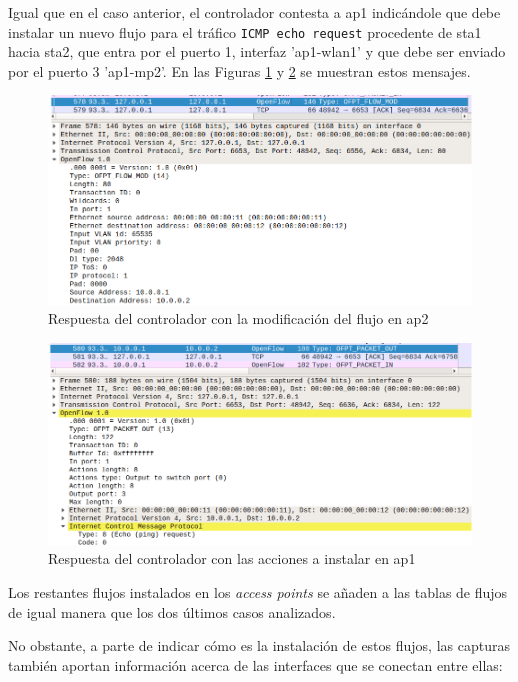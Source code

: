\documentclass[a4paper,12pt,twoside,spanish]{book}
\begin{document}
Igual que en el caso anterior, el controlador contesta a ap1 indicándole que debe instalar un nuevo flujo para el tráfico \texttt{ICMP echo request} procedente de sta1 hacia sta2, que entra por el puerto 1, interfaz 'ap1-wlan1' y que debe ser enviado por el puerto 3 'ap1-mp2'. En las Figuras \ref{fig:capt_7} y \ref{fig:capt_8} se muestran estos mensajes.\par 
	
	\begin{figure}[!h]
		\centering
		\includegraphics[scale=0.4]{Figuras/capt_7.png}
		\caption{Respuesta del controlador con la modificación del flujo en ap2}
		\label{fig:capt_7}
	\end{figure}
	
	\begin{figure}[h]
		\centering
		\includegraphics[scale=0.4]{Figuras/capt_8.png}
		\caption{Respuesta del controlador con las acciones a instalar en ap1}
		\label{fig:capt_8}
	\end{figure}

Los restantes flujos instalados en los \textit{access points} se añaden a las tablas de flujos de igual manera que los dos últimos casos analizados.\par 

No obstante, a parte de indicar cómo es la instalación de estos flujos, las capturas también aportan información acerca de las interfaces que se conectan entre ellas:\par 
\end{document}
